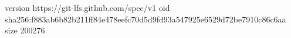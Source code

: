 version https://git-lfs.github.com/spec/v1
oid sha256:f883ab6b82b211ff84e478eefc70d5d9fd93a547925e6529d72be7910c86c6aa
size 200276
